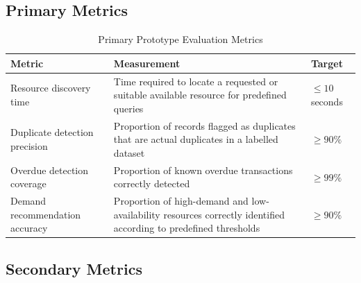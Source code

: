 \documentclass{tietreport}
\begin{document}
\subsection{Primary Metrics}

\begin{table}[H]
\centering
\caption{Primary Prototype Evaluation Metrics}
\label{tab:primarymetrics}

\begin{tabularx}{\textwidth}{>{\raggedright\arraybackslash}p{3.5cm}
                              X
                              >{\centering\arraybackslash}p{2.5cm}}
\toprule
\textbf{Metric} & \textbf{Measurement} & \textbf{Target} \\
\midrule

Resource discovery time &
Time required to locate a requested or suitable available resource for
predefined queries &
$\leq 10$ seconds \\

Duplicate detection precision &
Proportion of records flagged as duplicates that are actual duplicates
in a labelled dataset &
$\geq 90\%$ \\

Overdue detection coverage &
Proportion of known overdue transactions correctly detected &
$\geq 99\%$ \\

Demand recommendation accuracy &
Proportion of high-demand and low-availability resources correctly
identified according to predefined thresholds &
$\geq 90\%$ \\

\bottomrule
\end{tabularx}
\end{table}

\subsection{Secondary Metrics}
\end{document}
